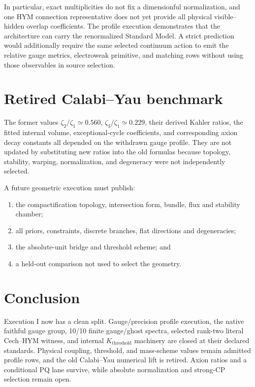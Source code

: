 \documentclass[11pt]{article}
\begin{document}
In particular, exact multiplicities do not fix a dimensionful normalization,
and one HYM connection representative does not yet provide all physical
visible--hidden overlap coefficients. The profile execution demonstrates that
the architecture can carry the renormalized Standard Model. A strict
prediction would additionally require the same selected continuum action to
emit the relative gauge metrics, electroweak primitive, and matching rows
without using those observables in source selection.

\section{Retired Calabi--Yau benchmark}

The former values $\zeta_2/\zeta_1\simeq0.560$,
$\zeta_3/\zeta_1\simeq0.229$, their derived Kahler ratios, the fitted internal
volume, exceptional-cycle coefficients, and corresponding axion decay
constants all depended on the withdrawn gauge profile. They are not updated by
substituting new ratios into the old formulas because topology, stability,
warping, normalization, and degeneracy were not independently selected.

A future geometric execution must publish:
\begin{enumerate}
\item the compactification topology, intersection form, bundle, flux and
stability chamber;
\item all priors, constraints, discrete branches, flat directions and
degeneracies;
\item the absolute-unit bridge and threshold scheme; and
\item a held-out comparison not used to select the geometry.
\end{enumerate}

\section{Conclusion}

Execution I now has a clean split. Gauge/precision profile execution, the
native faithful gauge group, 10/10 finite gauge/ghost spectra, selected
rank-two literal Cech--HYM witness, and internal $K_{\mathrm{threshold}}$
machinery are closed at their declared standards. Physical coupling,
threshold, and mass-scheme values remain admitted profile rows, and the old
Calabi--Yau numerical lift is retired. Axion ratios and a conditional PQ lane
survive, while absolute normalization and strong-CP selection remain open.
\end{document}
